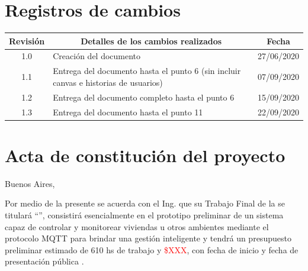 \documentclass[11pt]{charter}
\begin{document}
\maketitle
\thispagestyle{empty}
\pagebreak


\thispagestyle{empty}
{\setlength{\parskip}{0pt}
\tableofcontents{}
}
\pagebreak


\section{Registros de cambios}
\label{sec:registro}


\begin{table}[ht]
\label{tab:registro}
\centering
\begin{tabularx}{\linewidth}{@{}|c|X|c|@{}}
\hline
\rowcolor[HTML]{C0C0C0} 
Revisión & \multicolumn{1}{c|}{\cellcolor[HTML]{C0C0C0}Detalles de los cambios realizados} & Fecha      \\ \hline
1.0      & Creación del documento                                          & 27/06/2020 \\ \hline
1.1      & Entrega del documento hasta el punto 6 \newline
			(sin incluir canvas e historias de usuarios)            & 07/09/2020 \\ \hline
1.2      & Entrega del documento completo hasta el punto 6          & 15/09/2020 \\ \hline
1.3      & Entrega del documento hasta el punto 11  & 22/09/2020 \\ \hline
\end{tabularx}
\end{table}

\pagebreak



\section{Acta de constitución del proyecto}
\label{sec:acta}

\begin{flushright}
Buenos Aires, \fechaInicioName
\end{flushright}

\vspace{2cm}

Por medio de la presente se acuerda con el Ing. \authorname\hspace{1px} que su Trabajo Final de la \degreename\hspace{1px} se titulará ``\ttitle'', consistirá esencialmente en el prototipo preliminar de un sistema capaz de controlar y monitorear viviendas u otros ambientes mediante el protocolo MQTT para brindar una gestión inteligente y tendrá un presupuesto preliminar estimado de 610 hs de trabajo y \textcolor{red}{\$XXX}, con fecha de inicio \fechaInicioName\hspace{1px} y fecha de presentación pública \fechaFinalName.
\end{document}
